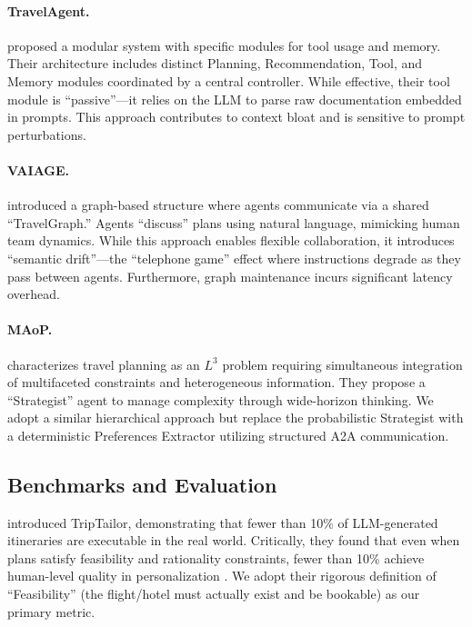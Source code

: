 \documentclass[preprint,review,12pt]{elsarticle}
\begin{document}
\paragraph{TravelAgent.} \citet{chen2024travelagent} proposed a modular system with specific modules for tool usage and memory. Their architecture includes distinct Planning, Recommendation, Tool, and Memory modules coordinated by a central controller. While effective, their tool module is ``passive''---it relies on the LLM to parse raw documentation embedded in prompts. This approach contributes to context bloat and is sensitive to prompt perturbations.

\paragraph{VAIAGE.} \citet{ge2025vaiage} introduced a graph-based structure where agents communicate via a shared ``TravelGraph.'' Agents ``discuss'' plans using natural language, mimicking human team dynamics. While this approach enables flexible collaboration, it introduces ``semantic drift''---the ``telephone game'' effect where instructions degrade as they pass between agents. Furthermore, graph maintenance incurs significant latency overhead.

\paragraph{MAoP.} \citet{yang2025planyourtravel} characterizes travel planning as an $L^3$ problem requiring simultaneous integration of multifaceted constraints and heterogeneous information. They propose a ``Strategist'' agent to manage complexity through wide-horizon thinking. We adopt a similar hierarchical approach but replace the probabilistic Strategist with a deterministic Preferences Extractor utilizing structured A2A communication.

\subsection{Benchmarks and Evaluation}

\citet{shen2025triptailor} introduced TripTailor, demonstrating that fewer than 10\% of LLM-generated itineraries are executable in the real world. Critically, they found that even when plans satisfy feasibility and rationality constraints, fewer than 10\% achieve human-level quality in personalization \citep{dhote2025smart}. We adopt their rigorous definition of ``Feasibility'' (the flight/hotel must actually exist and be bookable) as our primary metric.
\end{document}
